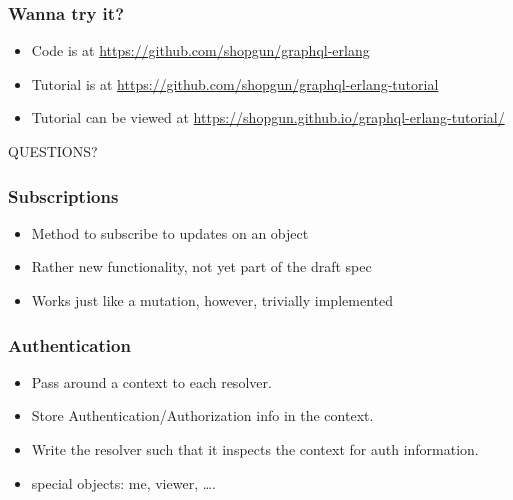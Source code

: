 \documentclass[lualatex]{beamer}
\begin{document}
\begin{frame}
  \frametitle{Wanna try it?}
  \begin{itemize}
  \item Code is at \url{https://github.com/shopgun/graphql-erlang}
  \item Tutorial is at
    \url{https://github.com/shopgun/graphql-erlang-tutorial}
  \item Tutorial can be viewed at
    \url{https://shopgun.github.io/graphql-erlang-tutorial/}
  \end{itemize}
\end{frame}

\begin{frame}
  QUESTIONS?
\end{frame}

\begin{frame}
  \frametitle{Subscriptions}
  \begin{itemize}
  \item Method to subscribe to updates on an object
  \item Rather new functionality, not yet part of the draft spec
  \item Works just like a mutation, however, trivially implemented
  \end{itemize}
\end{frame}

\begin{frame}
  \frametitle{Authentication}
  \begin{itemize}
  \item Pass around a context to each resolver.
  \item Store Authentication/Authorization info in the context.
  \item Write the resolver such that it inspects the context for auth
    information.
  \item special objects: me, viewer, \ldots.
  \end{itemize}
\end{frame}
\end{document}
